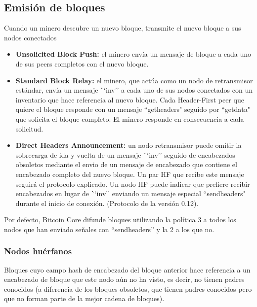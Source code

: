 \documentclass[11pt,a4paper]{article}
\begin{document}
\subsection{Emisión de bloques}

Cuando un minero descubre un nuevo bloque, transmite el nuevo bloque a sus nodos conectados

\begin{itemize}

	\item \textbf{Unsolicited Block Push:} el minero envía un mensaje de bloque a cada uno de sus peers completos con el nuevo bloque.

	\item \textbf{Standard Block Relay:} el minero, que actúa como un nodo de retransmisor estándar, envía un mensaje \```inv'' a cada uno de sus nodos conectados con un inventario que hace referencia al nuevo bloque. Cada Header-First peer que quiere el bloque responde con un mensaje ``getheaders" seguido por ``getdata" que solicita el bloque completo. El minero responde en consecuencia a cada solicitud.

	\item \textbf{Direct Headers Announcement:} un nodo retransmisor puede omitir la sobrecarga de ida y vuelta de un mensaje \```inv'' seguido de encabezados obsoletos mediante el envio de un mensaje de encabezado que contiene el encabezado completo del nuevo bloque. Un par HF que recibe este mensaje seguirá el protocolo explicado. Un nodo HF puede indicar que prefiere recibir encabezados en lugar de \```inv'' enviando un mensaje especial ``sendheaders" durante el inicio de conexión. (Protocolo de la versión 0.12).

\end{itemize}

Por defecto, Bitcoin Core difunde bloques utilizando la política 3 a todos los nodos que han enviado señales con ``sendheaders'' y la 2 a los que no.

\subsubsection{Nodos huérfanos}

Bloques cuyo campo hash de encabezado del bloque anterior hace referencia a un encabezado de bloque que este nodo aún no ha visto, es decir, no tienen padres conocidos (a diferencia de los bloques obsoletos, que tienen padres conocidos pero que no forman parte de la mejor cadena de bloques).\\
\end{document}
